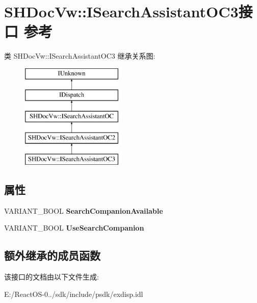 \hypertarget{interface_s_h_doc_vw_1_1_i_search_assistant_o_c3}{}\section{S\+H\+Doc\+Vw\+:\+:I\+Search\+Assistant\+O\+C3接口 参考}
\label{interface_s_h_doc_vw_1_1_i_search_assistant_o_c3}
类 S\+H\+Doc\+Vw\+:\+:I\+Search\+Assistant\+O\+C3 继承关系图\+:\begin{figure}[H]
\begin{center}
\leavevmode
\includegraphics[height=5.000000cm]{interface_s_h_doc_vw_1_1_i_search_assistant_o_c3}
\end{center}
\end{figure}
\subsection*{属性}
\begin{DoxyCompactItemize}
\item 
\mbox{\label{interface_s_h_doc_vw_1_1_i_search_assistant_o_c3_ae397057c5c10660f6581334de5db66a6}} 
V\+A\+R\+I\+A\+N\+T\+\_\+\+B\+O\+OL {\bfseries Search\+Companion\+Available}
\item 
\mbox{\label{interface_s_h_doc_vw_1_1_i_search_assistant_o_c3_a77e2a283a27dd6bec7a1230f487fa014}} 
V\+A\+R\+I\+A\+N\+T\+\_\+\+B\+O\+OL {\bfseries Use\+Search\+Companion}
\end{DoxyCompactItemize}
\subsection*{额外继承的成员函数}


该接口的文档由以下文件生成\+:\begin{DoxyCompactItemize}
\item 
E\+:/\+React\+O\+S-\/0../sdk/include/psdk/exdisp.\+idl\end{DoxyCompactItemize}
